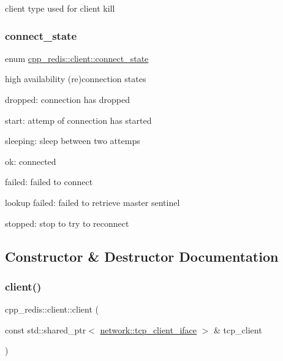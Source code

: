 client type used for client kill \mbox{\label{classcpp__redis_1_1client_a2512bd48dd45391249a69bd720c1e4da}} 
\subsubsection{\texorpdfstring{connect\+\_\+state}{connect\_state}}
{\footnotesize\ttfamily enum \hyperlink{classcpp__redis_1_1client_a2512bd48dd45391249a69bd720c1e4da}{cpp\+\_\+redis\+::client\+::connect\+\_\+state}\hspace{0.3cm}{\ttfamily [strong]}}

high availability (re)connection states
\begin{DoxyItemize}
\item dropped\+: connection has dropped
\item start\+: attemp of connection has started
\item sleeping\+: sleep between two attemps
\item ok\+: connected
\item failed\+: failed to connect
\item lookup failed\+: failed to retrieve master sentinel
\item stopped\+: stop to try to reconnect 
\end{DoxyItemize}

\subsection{Constructor \& Destructor Documentation}
\mbox{\label{classcpp__redis_1_1client_ae879c3a6829a2da9d03f80c1ec4b8d9b}} 
\subsubsection{\texorpdfstring{client()}{client()}}
{\footnotesize\ttfamily cpp\+\_\+redis\+::client\+::client (\begin{DoxyParamCaption}\item[{const std\+::shared\+\_\+ptr$<$ \hyperlink{classcpp__redis_1_1network_1_1tcp__client__iface}{network\+::tcp\+\_\+client\+\_\+iface} $>$ \&}]{tcp\+\_\+client }\end{DoxyParamCaption})\hspace{0.3cm}{\ttfamily [explicit]}}

